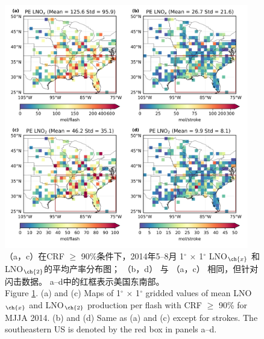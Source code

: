 \begin{figure}[H]
\centering
\includegraphics[width=0.95\textwidth]{./figures/us_pe_sum.png}
\caption{（a，c）在CRF $\geq$ 90\%条件下，2014年5--8月 1$^{\circ}$ $\times$ 1$^{\circ}$ LNO$_{\ch{x}}$ 和LNO$_{\ch{2}}$的平均产率分布图；
     （b，d） 与 （a，c） 相同，但针对闪击数据。
     a--d中的红框表示美国东南部。\\
     Figure \ref{fig:us_pe_sum}. (a) and (c) Maps of 1$^{\circ}$ $\times$ 1$^{\circ}$ gridded values of mean LNO$_{\ch{x}}$
    and LNO$_{\ch{2}}$ production per flash with CRF $\geq$ 90\% for MJJA 2014.
    (b) and (d) Same as (a) and (c) except for strokes.
    The southeastern US is denoted by the red box in panels a--d.
}
\label{fig:us_pe_sum}
\end{figure}


